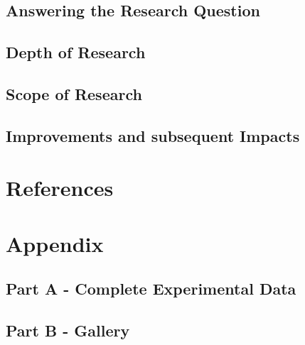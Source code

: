\documentclass[a4paper,12pt]{extarticle}
\begin{document}
\subsection{Answering the Research Question}

\subsection{Depth of Research}

\subsection{Scope of Research}

\subsection{Improvements and subsequent Impacts}

\section{References}

\section{Appendix}

\subsection{Part A - Complete Experimental Data}

\subsection{Part B - Gallery}
\end{document}
